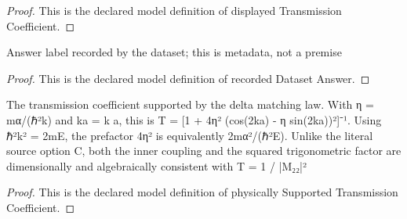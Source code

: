 \begin{proof}
  This is the declared model definition of displayed Transmission Coefficient.
\end{proof}
\begin{definition}
  \label{def:physics:phyx-mini-0602:phyxminiproblems-problemphyxmini0602-recordeddatasetanswer}
  Answer label recorded by the dataset; this is metadata, not a premise
\end{definition}
\begin{proof}
  This is the declared model definition of recorded Dataset Answer.
\end{proof}
\begin{definition}
  \label{def:physics:phyx-mini-0602:phyxminiproblems-problemphyxmini0602-physicallysupportedtransmissioncoefficient}
  The transmission coefficient supported by the delta matching law. With η = mα/(ℏ²k) and ka = k a, this is T = [1 + 4η² (cos(2ka) - η sin(2ka))²]⁻¹. Using ℏ²k² = 2mE, the prefactor 4η² is equivalently 2mα²/(ℏ²E). Unlike the literal source option C, both the inner coupling and the squared trigonometric factor are dimensionally and algebraically consistent with T = 1 / |M₂₂|²
\end{definition}
\begin{proof}
  This is the declared model definition of physically Supported Transmission Coefficient.
\end{proof}
